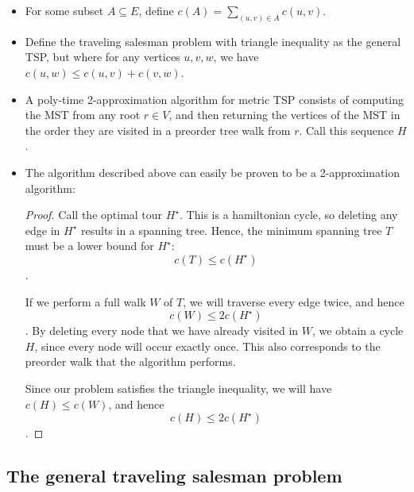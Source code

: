 \begin{itemize}
\item For some subset $A \subseteq E$, define $c(A) = \sum_{(u,v) \in A} c(u,v)$.
\item Define the traveling salesman problem with triangle inequality
  as the general TSP, but where for any vertices $u,v,w$, we have
  $c(u,w) \leq c(u,v) + c(v,w)$.
\item A poly-time 2-approximation algorithm for metric TSP consists of
  computing the MST from any root $r \in V$, and then returning the
  vertices of the MST in the order they are visited in a preorder tree
  walk from $r$. Call this sequence $H$.
\item The algorithm described above can easily be proven to be a
  2-approximation algorithm:
  \begin{proof}
    Call the optimal tour $H^\star$. This is a hamiltonian cycle, so
    deleting any edge in $H^\star$ results in a spanning tree. Hence,
    the minimum spanning tree $T$ must be a lower bound for
    $H^\star$: $$c(T) \leq c(H^\star)$$.

    If we perform a full walk $W$ of $T$, we will traverse every edge
    twice, and hence $$c(W) \leq 2c(H^\star)$$. By deleting every node
    that we have already visited in $W$, we obtain a cycle $H$, since
    every node will occur exactly once. This also corresponds to the
    preorder walk that the algorithm performs.

    Since our problem satisfies the triangle inequality, we will have
    $c(H) \leq c(W)$, and hence $$c(H) \leq 2c(H^\star)$$.
  \end{proof}
\end{itemize}

\subsection{The general traveling salesman problem}

